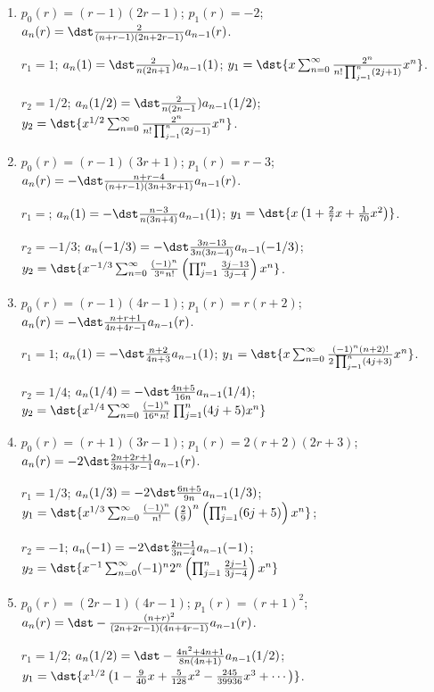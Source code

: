 \documentclass[openany]{book}
\newenvironment{sectionSolutions}{
 \begin{enumerate}[item-label={\thesection.\arabic{enumi}.}]
}{
 \end{enumerate}
}
\begin{document}
\begin{sectionSolutions}
$r_2=-2$;
$a_n(-2)=-\dst\frac{1}{ 2n-5}a_{n-1}(-2)$;
$y_2=\dst{\frac{1}{ x^2}\sum_{n=0}^\infty\frac{(-1)^n}{\prod_{j=1}^n(2j-5)}
x^n}$.


\item
$p_0(r)=(r-1)(2r-1)$;
$p_1(r)= -2$;
$a_n(r)=\dst\frac{2}{ (n+r-1)(2n+2r-1)}a_{n-1}(r)$.

$r_1=1$;
$a_n(1)=\dst\frac{2}{ n(2n+1})a_{n-1}(1)$;
$y_1=\dst{x\sum_{n=0}^\infty\frac{2^n}{
n!\prod_{j=1}^n(2j+1)}x^n}$.

$r_2=1/2$;
$a_n(1/2)=\dst\frac{2}{ n(2n-1})a_{n-1}(1/2)$;
$y_2=\dst{x^{1/2}\sum_{n=0}^\infty\frac{2^n}{
n!\prod_{j=1}^n(2j-1)}x^n}$.


\item
$p_0(r)=(r-1)(3r+1)$;
$p_1(r)=r-3$;
$a_n(r)=-\dst\frac{n+r-4}{ (n+r-1)(3n+3r+1)}a_{n-1}(r)$.

$r_1=$;
$a_n(1)=-\dst\frac{n-3}{ n(3n+4)}a_{n-1}(1)$;
$y_1=\dst{x\left(1+\frac{2}{7}x+\frac{1}{70}x^2\right)}$.

$r_2=-1/3$;
$a_n(-1/3)=-\dst\frac{3n-13}{ 3n(3n-4)}a_{n-1}(-1/3)$;
$y_2=\dst{x^{-1/3}\sum_{n=0}^\infty\frac{(-1)^n}{3^nn!}\left(\prod_{j=1}^n
\frac{3j-13}{3j-4}\right)x^n}$.


\item
$p_0(r)=(r-1)(4r-1)$;
$p_1(r)=r(r+2)$;
$a_n(r)=-\dst\frac{n+r+1}{ 4n+4r-1}a_{n-1}(r)$.

$r_1=1$;
$a_n(1)= -\dst\frac{n+2}{ 4n+3}a_{n-1}(1)$;
$y_1=\dst{x\sum_{n=0}^\infty\frac{(-1)^n(n+2)!}{2\prod_{j=1}^n(4j+3)}
x^n}$.

$r_2=1/4$;
$a_n(1/4)=-\dst\frac{4n+5}{ 16n}a_{n-1}(1/4)$;
$y_2=\dst{x^{1/4}\sum_{n=0}^\infty\frac{(-1)^n}{16^nn!}\prod_{j=1}^n(4j+5)
x^n}$


\item
$p_0(r)=(r+1)(3r-1)$;
$p_1(r)=2(r+2)(2r+3)$;
$a_n(r)=-2\dst\frac{2n+2r+1}{ 3n+3r-1}a_{n-1}(r)$.

$r_1=1/3$;
$a_n(1/3)=-2\dst\frac{6n+5}{ 9n}a_{n-1}(1/3)$;
$y_1=\dst{x^{1/3}\sum_{n=0}^\infty\frac{(-1)^n}{
n!}\left(\frac{2}{9}\right)^n\left(\prod_{j=1}^n(6j+5)\right)
x^n}$;

$r_2=-1$;
$a_n(-1)=-2\dst\frac{2n-1}{ 3n-4}a_{n-1}(-1)$;
$y_2=\dst{x^{-1}\sum_{n=0}^\infty(-1)^n2^n\left(\prod_{j=1}^n
\frac{2j-1}{3j-4}\right) x^n}$

\addtocounter{enumi}{2}
\item%
$p_0(r)=(2r-1)(4r-1)$;
$p_1(r)=(r+1)^2$;
$a_n(r)=\dst-\frac{(n+r)^2}{(2n+2r-1)(4n+4r-1)} a_{n-1}(r)$.

$r_1=1/2$;
$a_n(1/2)=\dst-\frac{4n^2+4n+1}{8n(4n+1)} a_{n-1}(1/2)$;
$y_1=\dst{x^{1/2}\left(1-\frac{9}{40}x+\frac{5}{128}x^2-\frac{245}{39936}x^3
+\cdots\right)}$.


\end{sectionSolutions}
\end{document}
